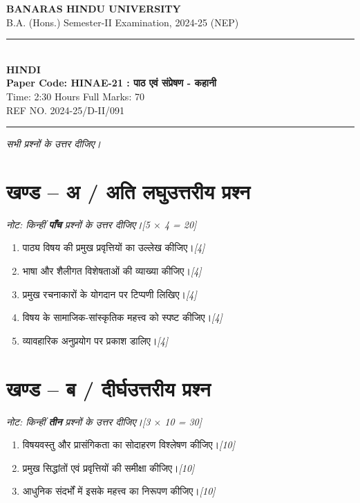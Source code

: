 \documentclass[11pt,a4paper]{article}
\newcommand{\pts}[1]{\hfill \textit{[#1]}}
\begin{document}
\begin{center}
  {\large\bfseries BANARAS HINDU UNIVERSITY}\\[2pt]
  {\normalsize B.A. (Hons.) Semester-II Examination, 2024-25 (NEP)}\\[6pt]
  \rule{0.8\linewidth}{0.5pt}\\[6pt]
  {\large\bfseries HINDI}\\[4pt]
  {\large\bfseries Paper Code: HINAE-21 : पाठ एवं संप्रेषण - कहानी}\\[4pt]
  {\normalsize Time: 2:30 Hours \hfill Full Marks: 70}\\[2pt]
  {\small REF NO. 2024-25/D-II/091}
\end{center}
\rule{\linewidth}{0.4pt}
\smallskip


\noindent \textit{सभी प्रश्नों के उत्तर दीजिए।}

\bigskip

\section*{खण्ड -- अ / अति लघुउत्तरीय प्रश्न}
\noindent \textit{नोट: किन्हीं \textbf{पाँच} प्रश्नों के उत्तर दीजिए।}\pts{5 $\times$ 4 = 20}

\begin{enumerate}[label=\textbf{(\ क\ )},leftmargin=*,itemsep=6pt]
  \item[\textbf{(क)}] पाठ्य विषय की प्रमुख प्रवृत्तियों का उल्लेख कीजिए।\pts{4}
  \item[\textbf{(ख)}] भाषा और शैलीगत विशेषताओं की व्याख्या कीजिए।\pts{4}
  \item[\textbf{(ग)}] प्रमुख रचनाकारों के योगदान पर टिप्पणी लिखिए।\pts{4}
  \item[\textbf{(घ)}] विषय के सामाजिक-सांस्कृतिक महत्त्व को स्पष्ट कीजिए।\pts{4}
  \item[\textbf{(ङ)}] व्यावहारिक अनुप्रयोग पर प्रकाश डालिए।\pts{4}
\end{enumerate}

\bigskip

\section*{खण्ड -- ब / दीर्घउत्तरीय प्रश्न}
\noindent \textit{नोट: किन्हीं \textbf{तीन} प्रश्नों के उत्तर दीजिए।}\pts{3 $\times$ 10 = 30}

\begin{enumerate}[label=\textbf{\arabic*.},leftmargin=*,itemsep=12pt]
  \item विषयवस्तु और प्रासंगिकता का सोदाहरण विश्लेषण कीजिए।\pts{10}
  \item प्रमुख सिद्धांतों एवं प्रवृत्तियों की समीक्षा कीजिए।\pts{10}
  \item आधुनिक संदर्भों में इसके महत्त्व का निरूपण कीजिए।\pts{10}
\end{enumerate}
\end{document}
